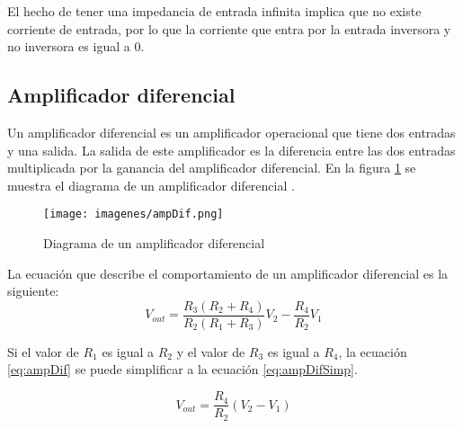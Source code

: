  El hecho de tener una 
impedancia de entrada infinita implica que no existe corriente de entrada, por lo que
la corriente que entra por la entrada inversora y no inversora es igual a 0. 

\subsection{Amplificador diferencial}

Un amplificador diferencial es un amplificador operacional que tiene dos entradas
y una salida. La salida de este amplificador es la diferencia entre las dos entradas
multiplicada por la ganancia del amplificador diferencial. En la figura \ref{fig:ampDif}
se muestra el diagrama de un amplificador diferencial \cite{electronic_Boylestad}.

\begin{figure}[H]
    \centering
    \texttt{[image: imagenes/ampDif.png]}
    \caption{Diagrama de un amplificador diferencial \cite{electronic_Boylestad}}
    \label{fig:ampDif}
\end{figure}

La ecuación que describe el comportamiento de un amplificador diferencial es la siguiente:
\begin{equation}
    V_{out} =  \frac{R_3(R_2+R_4)}{R_2(R_1+R_3)}V_2 - \frac{R_4}{R_2}V_1
    \label{eq:ampDif}
\end{equation}

Si el valor de $R_1$ es igual a $R_2$ y el valor de $R_3$ es igual a $R_4$, la ecuación
\ref{eq:ampDif} se puede simplificar a la ecuación \ref{eq:ampDifSimp}.

\begin{equation}
    V_{out} =  \frac{R_4}{R_2}(V_2 - V_1)
    \label{eq:ampDifSimp}
\end{equation}
